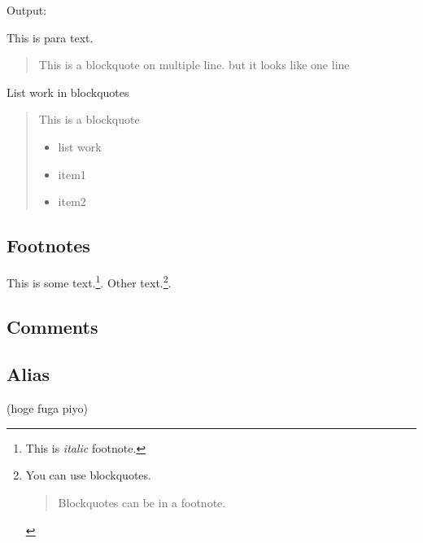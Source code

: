 \documentclass[a4j, titlepage]{jarticle}
\begin{document}
Output:

This is para text.

\begin{quote}
This is a blockquote
on multiple line.
but it looks like one line
\end{quote}

List work in blockquotes

\begin{quotation}
This is a blockquote

\begin{itemize}
\item list work
\item item1
\item item2
\end{itemize}
\end{quotation}

\subsection{Footnotes}

This is some text.\footnote{This is \emph{italic} footnote.}. Other text.\footnote{You can use blockquotes.

\begin{quote}
Blockquotes can be in a footnote.
\end{quote}}.

\subsection{Comments}


\subsection{Alias}


(hoge fuga piyo)
\end{document}
